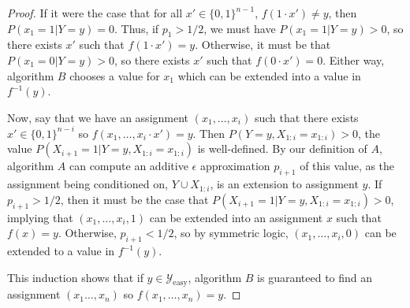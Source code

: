 \documentclass{article}
\theoremstyle{definition}
\theoremstyle{remark}
\def \Pa{\text{Pa}}
\begin{document}
\begin{proof}
If it were the case that for all $x' \in \{0, 1\}^{n-1}$,
$f(1 \cdot x') \neq y$, then $P(x_1 = 1 | Y = y) = 0$.
Thus, if $p_1 > 1/2$, we must have $P(x_1 = 1 | Y = y) > 0$, so
there exists $x'$ such that $f(1 \cdot x') = y$.
Otherwise, it must be that $P(x_1 = 0 | Y = y) > 0$,
so there exists $x'$ such that $f(0 \cdot x') = 0$.
Either way, algorithm $B$ chooses a value for $x_1$
which can be extended into a value in $f^{-1}(y)$.

Now, say that we have an assignment $(x_1, \dots, x_i)$ such that
there exists $x' \in \{0, 1\}^{n - i}$ so $f(x_1, \dots, x_i \cdot x') = y$.
Then $P(Y = y, X_{1:i} = x_{1:i}) > 0$, 
the value $P(X_{i + 1} = 1 | Y = y, X_{1:i} = x_{1:i})$ is well-defined.
By our definition of $A$, algorithm $A$ can compute an additive $\epsilon$
approximation $p_{i+1}$ of this value,
as the assignment being conditioned on, $Y \cup X_{1:i}$,
is an extension to assignment $y$.
If $p_{i+1} > 1/2$, then it must be the case
that $P(X_{i + 1} = 1 | Y = y, X_{1:i} = x_{1:i}) > 0$, implying
that $(x_1, \dots, x_i, 1)$ can be extended into an assignment $x$
such that $f(x) = y$.
Otherwise, $p_{i + 1} < 1/2$, so by symmetric logic,
$(x_1, \dots, x_i, 0)$ can be extended to a value in $f^{-1}(y)$.

This induction shows that if $y \in \mathcal{Y}_\text{easy}$,
algorithm $B$ is guaranteed to find an assignment $(x_1 \dots, x_n)$
so $f(x_1, \dots, x_n) = y$.







\end{proof}
\end{document}

